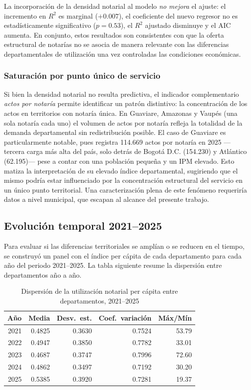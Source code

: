 \documentclass{article}
\begin{document}
La incorporación de la densidad notarial al modelo \emph{no mejora}
el ajuste: el incremento en $R^{2}$ es marginal ($+0.007$), el
coeficiente del nuevo regresor no es estadísticamente significativo
($p = 0.53$), el $R^{2}$ ajustado disminuye y el AIC aumenta. En
conjunto, estos resultados son consistentes con que la oferta
estructural de notarías no se asocia de manera relevante con las
diferencias departamentales de utilización una vez controladas las
condiciones económicas.

\subsubsection*{Saturación por punto único de servicio}

Si bien la densidad notarial no resulta predictiva, el indicador
complementario \emph{actos por notaría} permite identificar un patrón
distintivo: la concentración de los actos en territorios con notaría
única. En Guaviare, Amazonas y Vaupés (una sola notaría cada uno) el
volumen de actos por notaría refleja la totalidad de la demanda
departamental sin redistribución posible. El caso de Guaviare es
particularmente notable, pues registra 114.669 actos por notaría en
2025 ---tercera carga más alta del país, solo detrás de Bogotá D.C.
(154.230) y Atlántico (62.195)--- pese a contar con una población
pequeña y un IPM elevado. Esto matiza la interpretación de su elevado
índice departamental, sugiriendo que el mismo podría estar influenciado 
por la concentración estructural del servicio en un único punto territorial. Una 
caracterización plena de este fenómeno
requeriría datos a nivel municipal, que escapan al alcance del presente
trabajo.

\subsection{Evolución temporal 2021--2025}

Para evaluar si las diferencias territoriales se amplían o se 
reducen en el tiempo, se construyó un panel con el índice per 
cápita de cada departamento para cada año del periodo 
2021--2025. La tabla siguiente resume la dispersión entre 
departamentos año a año.

\begin{table}[H]
\centering
\begin{tabular}{rrrrr}
\toprule
\textbf{Año} & \textbf{Media} & \textbf{Desv.\ est.} & 
\textbf{Coef.\ variación} & \textbf{Máx/Mín} \\
\midrule
2021 & 0.4825 & 0.3630 & 0.7524 & 53.79 \\
2022 & 0.4947 & 0.3850 & 0.7782 & 33.01 \\
2023 & 0.4687 & 0.3747 & 0.7996 & 72.60 \\
2024 & 0.4862 & 0.3497 & 0.7192 & 30.20 \\
2025 & 0.5385 & 0.3920 & 0.7281 & 19.37 \\
\bottomrule
\end{tabular}
\caption{Dispersión de la utilización notarial per cápita 
entre departamentos, 2021--2025}
\end{table}
\end{document}
